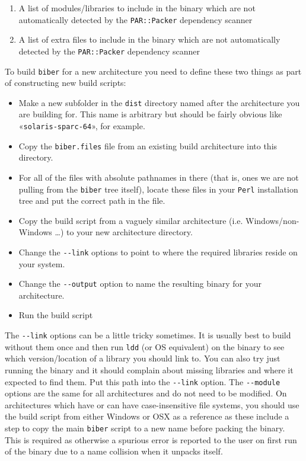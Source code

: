 \documentclass{ltxdockit}
\begin{document}
\begin{enumerate}
\item A list of modules/libraries to include in the binary which are not
  automatically detected by the \verb+PAR::Packer+ dependency
  scanner
\item A list of extra files to include in the binary which are not
  automatically detected by the \verb+PAR::Packer+ dependency
  scanner
\end{enumerate}

\noindent To build \verb+biber+ for a new architecture you need to
define these two things as part of constructing new build scripts:

\begin{itemize}
\item Make a new subfolder in the \verb+dist+ directory named after the
  architecture you are building for. This name is arbitrary but should
  be fairly obvious like «\verb+solaris-sparc-64+», for example.
\item Copy the \verb+biber.files+ file from an existing build
  architecture into this directory.
\item For all of the files with absolute pathnames in there (that is,
  ones we are not pulling from the \verb+biber+ tree itself), locate these
  files in your \verb+Perl+ installation tree and put the correct path in the
  file.
\item Copy the build script from a vaguely similar architecture
  (i.e. Windows/non-Windows \ldots) to your new architecture
  directory. 
\item Change the \verb+--link+ options to point to where the required
  libraries reside on your system.
\item Change the \verb+--output+ option to name the resulting binary
  for your architecture.
\item Run the build script
\end{itemize}

\noindent The \verb+--link+ options can be a little tricky
sometimes. It is usually best to build without them once and then run
\verb+ldd+ (or OS equivalent) on the binary to see which
version/location of a library you should link to. You can also try
just running the binary and it should complain about missing libraries
and where it expected to find them. Put this path into the
\verb+--link+ option. The \verb+--module+ options are the same for all
architectures and do not need to be modified.
On architectures which have or can have case-insensitive file systems,
you should use the build script from either Windows or OSX as a reference
as these include a step to copy the main \verb+biber+ script to a new name
before packing the binary. This is required as otherwise a spurious
error is reported to the user on first run of the binary due to a name
collision when it unpacks itself.
\end{document}
